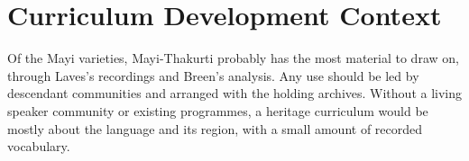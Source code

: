 \documentclass[12pt]{article}
\begin{document}
\section{Curriculum Development Context}
Of the Mayi varieties, Mayi-Thakurti probably has the most material to draw on, through Laves's recordings and Breen's analysis. Any use should be led by descendant communities and arranged with the holding archives. Without a living speaker community or existing programmes, a heritage curriculum would be mostly about the language and its region, with a small amount of recorded vocabulary.
\end{document}
